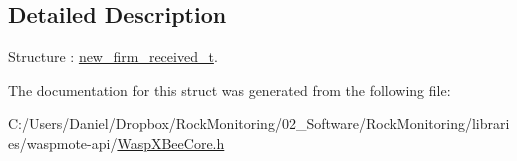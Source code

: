 \subsection{Detailed Description}
Structure \+: \hyperlink{structnew__firm__received__t}{new\+\_\+firm\+\_\+received\+\_\+t}. 

The documentation for this struct was generated from the following file\+:\begin{DoxyCompactItemize}
\item 
C\+:/\+Users/\+Daniel/\+Dropbox/\+Rock\+Monitoring/02\+\_\+\+Software/\+Rock\+Monitoring/libraries/waspmote-\/api/\hyperlink{_wasp_x_bee_core_8h}{Wasp\+X\+Bee\+Core.\+h}\end{DoxyCompactItemize}
